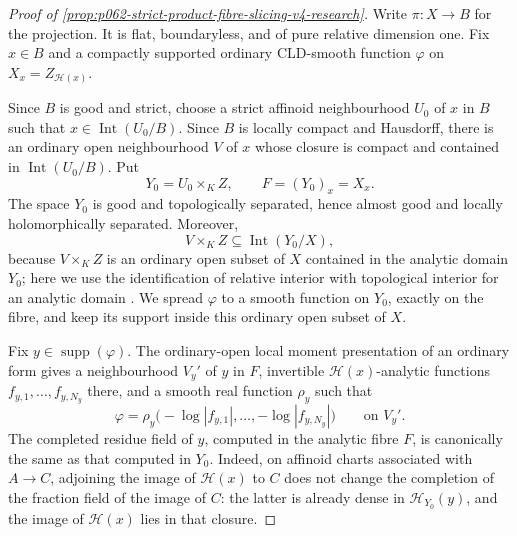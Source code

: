 
\begin{proof}[Proof of
\cref{prop:p062-strict-product-fibre-slicing-v4-research}]
Write \(\pi\colon X\to B\) for the projection.  It is flat,
boundaryless, and of pure relative dimension one.  Fix \(x\in B\) and a
compactly supported ordinary CLD-smooth function \(\varphi\) on
\(
 X_x=Z_{\mathscr H(x)}
\).

Since \(B\) is good and strict, choose a strict affinoid neighbourhood
\(U_0\) of \(x\) in \(B\) such that
\(
 x\in\operatorname{Int}(U_0/B)
\).  Since \(B\) is locally compact and Hausdorff, there is an ordinary
open neighbourhood \(V\) of \(x\) whose closure is compact and contained
in \(\operatorname{Int}(U_0/B)\).  Put
\[
                         Y_0=U_0\times_KZ,
                         \qquad F=(Y_0)_x=X_x.
\]
The space \(Y_0\) is good and topologically separated, hence almost good
and locally holomorphically separated.  Moreover,
\begin{equation}\label{eq:p062-endpoint-relative-interior-support-v4-research}
 V\times_KZ\subseteq\operatorname{Int}(Y_0/X),
\end{equation}
because \(V\times_KZ\) is an ordinary open subset of \(X\) contained in
the analytic domain \(Y_0\); here we use the identification of relative
interior with topological interior for an analytic domain
\cite[Proposition~1.5.5(i)]{Berk93}.  We spread \(\varphi\) to a smooth
function on \(Y_0\), exactly on the fibre, and keep its support inside this
ordinary open subset of \(X\).

Fix \(y\in\operatorname{supp}(\varphi)\).  The ordinary-open local moment
presentation of an ordinary form
\cite[Proposition~15.1.1(b)]{CLD25} gives a neighbourhood \(V_y'\) of \(y\) in
\(F\), invertible \(\mathscr H(x)\)-analytic functions
\(f_{y,1},\ldots,f_{y,N_y}\) there, and a smooth real function \(\rho_y\)
such that
\[
 \varphi=\rho_y\bigl(-\log|f_{y,1}|,\ldots,
                         -\log|f_{y,N_y}|\bigr)
 \qquad\text{on }V_y'.
\]
The completed residue field of \(y\), computed in the analytic fibre
\(F\), is canonically the same as that computed in \(Y_0\).  Indeed, on
affinoid charts associated with \(A\to C\), adjoining the image of
\(\mathscr H(x)\) to \(C\) does not change the completion of the fraction
field of the image of \(C\): the latter is already dense in
\(\mathscr H_{Y_0}(y)\), and the image of \(\mathscr H(x)\) lies in that
closure.


\end{proof}
